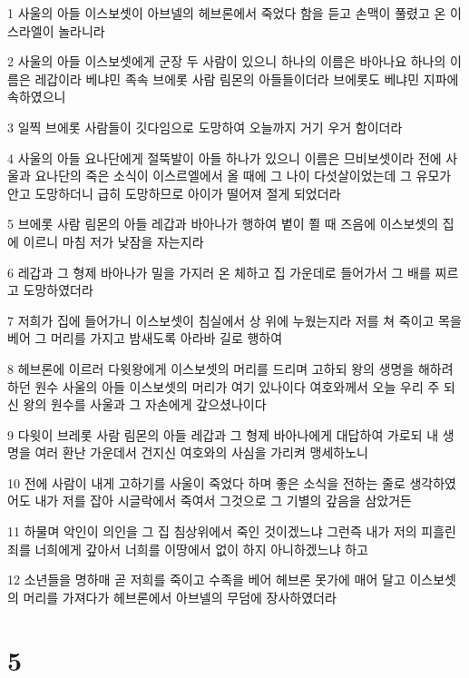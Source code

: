 \par 1 사울의 아들 이스보셋이 아브넬의 헤브론에서 죽었다 함을 듣고 손맥이 풀렸고 온 이스라엘이 놀라니라
\par 2 사울의 아들 이스보셋에게 군장 두 사람이 있으니 하나의 이름은 바아나요 하나의 이름은 레갑이라 베냐민 족속 브에롯 사람 림몬의 아들들이더라 브에롯도 베냐민 지파에 속하였으니
\par 3 일찍 브에롯 사람들이 깃다임으로 도망하여 오늘까지 거기 우거 함이더라
\par 4 사울의 아들 요나단에게 절뚝발이 아들 하나가 있으니 이름은 므비보셋이라 전에 사울과 요나단의 죽은 소식이 이스르엘에서 올 때에 그 나이 다섯살이었는데 그 유모가 안고 도망하더니 급히 도망하므로 아이가 떨어져 절게 되었더라
\par 5 브에롯 사람 림몬의 아들 레갑과 바아나가 행하여 볕이 쬘 때 즈음에 이스보셋의 집에 이르니 마침 저가 낮잠을 자는지라
\par 6 레갑과 그 형제 바아나가 밀을 가지러 온 체하고 집 가운데로 들어가서 그 배를 찌르고 도망하였더라
\par 7 저희가 집에 들어가니 이스보셋이 침실에서 상 위에 누웠는지라 저를 쳐 죽이고 목을 베어 그 머리를 가지고 밤새도록 아라바 길로 행하여
\par 8 헤브론에 이르러 다윗왕에게 이스보셋의 머리를 드리며 고하되 왕의 생명을 해하려 하던 원수 사울의 아들 이스보셋의 머리가 여기 있나이다 여호와께서 오늘 우리 주 되신 왕의 원수를 사울과 그 자손에게 갚으셨나이다
\par 9 다윗이 브레롯 사람 림몬의 아들 레갑과 그 형제 바아나에게 대답하여 가로되 내 생명을 여러 환난 가운데서 건지신 여호와의 사심을 가리켜 맹세하노니
\par 10 전에 사람이 내게 고하기를 사울이 죽었다 하며 좋은 소식을 전하는 줄로 생각하였어도 내가 저를 잡아 시글락에서 죽여서 그것으로 그 기별의 갚음을 삼았거든
\par 11 하물며 악인이 의인을 그 집 침상위에서 죽인 것이겠느냐 그런즉 내가 저의 피흘린 죄를 너희에게 갚아서 너희를 이땅에서 없이 하지 아니하겠느냐 하고
\par 12 소년들을 명하매 곧 저희를 죽이고 수족을 베어 헤브론 못가에 매어 달고 이스보셋의 머리를 가져다가 헤브론에서 아브넬의 무덤에 장사하였더라

\chapter{5}

